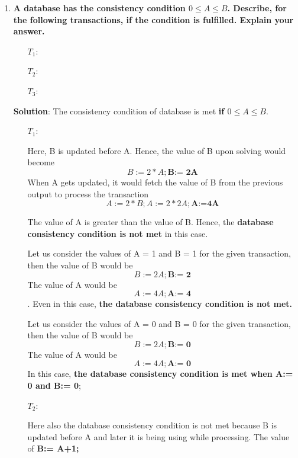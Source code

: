 \begin{enumerate}
	\item \textbf{A database has the consistency condition $0\leq A\leq B$. Describe, for the following transactions, if the condition is fulfilled. Explain your answer.}

    \begin{enumerate}

    \item[$T_1: $] 
    \item[$T_2: $] 
    \item[$T_3: $] 
    \end{enumerate}

\textbf{Solution}: The consistency condition of database is met \textbf{if $0\leq A\leq B$}. 

\begin{enumerate}

  \item[$T_1: $] 
  
  Here, B is updated before A. Hence, the value of B upon solving would become
  \[B:= 2*A ; \textbf{B:= 2A}\]
  When A gets updated, it would fetch the value of B from the previous output to process the transaction
  \[A:= 2*B ; A:= 2*2A ; \textbf{A:=4A}\]

  The value of A is greater than the value of B. Hence, the \textbf{\color{red} database consistency condition is not met} in this case.

  Let us consider the values of A = 1 and B = 1 for the given transaction, then the value of B would be  \[B:= 2A ; \textbf{B:= 2}\]
  The value of A would be \[A:=4A; \textbf{A:= 4}\]. Even in this case, \textbf{\color{red}the database consistency condition is not met.}

  Let us consider the values of A = 0 and B = 0 for the given transaction, then the value of B would be  \[B:= 2A ; \textbf{B:= 0}\] 
  The value of A would be \[A:=4A; \textbf{A:= 0}\] In this case, \textbf{\color{blue}the database consistency condition is met when A:= 0 and B:= 0};

  
  \item[$T_2: $] 

  Here also the database consistency condition is not met because B is updated before A and later it is being using while processing.
  The value of \textbf{B:= A+1;} 
  

\end{enumerate}
\end{enumerate}

